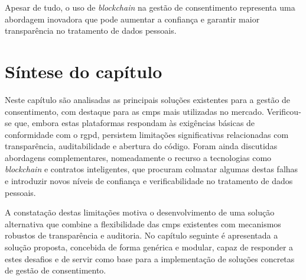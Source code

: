 Apesar de tudo, o uso de \textit{blockchain} na gestão de consentimento representa uma abordagem inovadora que pode aumentar a confiança e garantir maior transparência no tratamento de dados pessoais.

 

\section{Síntese do capítulo} 

Neste capítulo são analisadas as principais soluções existentes para a gestão de consentimento, com destaque para as \acrshort{cmp}s mais utilizadas no mercado. Verificou-se que, embora estas plataformas respondam às exigências básicas de conformidade com o \acrshort{rgpd}, persistem limitações significativas relacionadas com transparência, auditabilidade e abertura do código. Foram ainda discutidas abordagens complementares, nomeadamente o recurso a tecnologias como \textit{blockchain} e contratos inteligentes, que procuram colmatar algumas destas falhas e introduzir novos níveis de confiança e verificabilidade no tratamento de dados pessoais.

A constatação destas limitações motiva o desenvolvimento de uma solução alternativa que combine a flexibilidade das \acrshort{cmp}s existentes com mecanismos robustos de transparência e auditoria. No capítulo seguinte é apresentada a solução proposta, concebida de forma genérica e modular, capaz de responder a estes desafios e de servir como base para a implementação de soluções concretas de gestão de consentimento.
